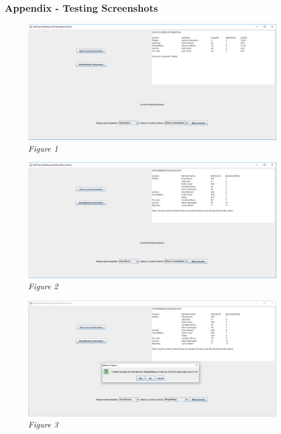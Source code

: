 \documentclass[12pt, oneside]{article}
\begin{document}
\subsubsection*{Appendix - Testing Screenshots}
\begin{figure}[ht!]
\centering
\includegraphics[width=17cm]{fig1}
\caption{\textit{Figure 1}}
\end{figure}
\begin{figure}[ht!]
\centering
\includegraphics[width=17cm]{fig2}
\caption*{ \textit{Figure 2} }
\end{figure}
\begin{figure}[ht!]
\centering
\includegraphics[width=17cm]{fig4}
\caption*{ \textit{Figure 3} }
\end{figure}
\end{document}
